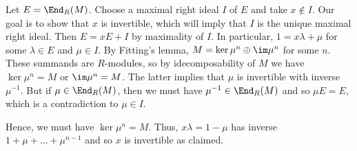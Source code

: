 Let $E = \End_R(M)$. Choose a maximal right ideal $I$ of $E$ and take
$x \notin I$. Our goal is to show that $x$ is invertible, which will imply
that $I$ is the unique maximal right ideal. Then $E = xE + I$ by maximality
of $I$. In particular, $1 = x\lambda + \mu$ for some $\lambda \in E$ and
$\mu \in I$. By Fitting's lemma, $M = \ker \mu^n \oplus \im \mu^n$ for some
$n$. These summands are $R$-modules, so by idecomposability of $M$ we have
$\ker \mu^n = M$ or $\im \mu^n = M$. The latter implies that $\mu$ is
invertible with inverse $\mu^{-1}$. But if $\mu \in \End_R(M)$, then we must
have $\mu^{-1} \in \End_R(M)$ and so $\mu E = E$, which is a contradiction to
$\mu \in I$.

Hence, we must have $\ker \mu^n = M$. Thus, $x\lambda = 1-\mu$ has inverse
$1 + \mu + \ldots + \mu^{n-1}$ and so $x$ is invertible as claimed.
